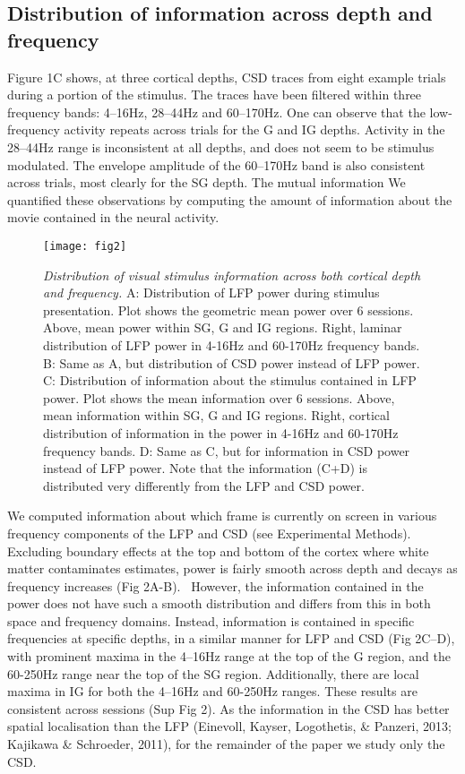 \subsection[Distribution of information across depth and frequency]{Distribution of information across depth and frequency}
Figure 1C shows, at three cortical depths, \ac{CSD} traces from eight example trials during a portion of the stimulus. The traces have been filtered within three frequency bands: 4--16Hz, 28--44Hz and 60--170Hz. One can observe that the low-frequency activity repeats across trials for the \ac{G} and \ac{IG} depths. Activity in the 28--44Hz range is inconsistent at all depths, and does not seem to be stimulus modulated. The envelope amplitude of the 60--170Hz band is also consistent across trials, most clearly for the \ac{SG} depth. The mutual information We quantified these observations by computing the amount of information about the movie contained in the neural activity.

\begin{figure}[htbp]
\centering \texttt{[image: fig2]}
%
\caption{%
\textit{Distribution of visual stimulus information across both cortical depth 
and frequency.}
A: Distribution of \ac{LFP} power during stimulus presentation. Plot shows the geometric mean 
power over 6 sessions. Above, mean power within \ac{SG}, \ac{G} and \ac{IG} regions. Right, laminar distribution of \ac{LFP} power in
4-16Hz and 60-170Hz frequency bands.
B: Same as A, but distribution of \ac{CSD} power instead of \ac{LFP} power.
C: Distribution of information about the stimulus contained in \ac{LFP} power. Plot 
shows the mean information over 6 sessions. Above, mean information within \ac{SG}, \ac{G} 
and \ac{IG} regions. Right, cortical distribution of information in the power in
4-16Hz and 60-170Hz frequency bands.
D: Same as C, but for information in \ac{CSD} power instead of \ac{LFP} power.
Note that the information (C+D) is distributed very differently from the \ac{LFP} and \ac{CSD} power.}%
\label{fig:lam_2}
\end{figure}

We computed information about which frame is currently on screen in various frequency components of the \ac{LFP} and \ac{CSD} (see Experimental Methods). Excluding boundary effects at the top and bottom of the cortex where white matter contaminates estimates, power is fairly smooth across depth and decays as frequency increases (Fig 2A-B). \ However, the information contained in the power does not have such a smooth distribution and differs from this in both space and frequency domains. Instead, information is contained in specific frequencies at specific depths, in a similar manner for \ac{LFP} and \ac{CSD} (Fig 2C--D), with prominent maxima in the 4--16Hz range at the top of the \ac{G} region, and the 60-250Hz range near the top of the \ac{SG} region. Additionally, there are local maxima in \ac{IG} for both the 4--16Hz and 60-250Hz ranges. These results are consistent across sessions (Sup Fig 2). As the information in the \ac{CSD} has better spatial localisation than the \ac{LFP} (Einevoll, Kayser, Logothetis, \& Panzeri, 2013; Kajikawa \& Schroeder, 2011), for the remainder of the paper we study only the \ac{CSD}.

